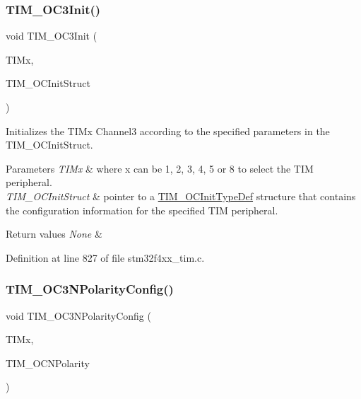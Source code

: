 \subsubsection{\texorpdfstring{T\+I\+M\+\_\+\+O\+C3\+Init()}{TIM\_OC3Init()}}
{\footnotesize\ttfamily void T\+I\+M\+\_\+\+O\+C3\+Init (\begin{DoxyParamCaption}\item[{\hyperlink{struct_t_i_m___type_def}{T\+I\+M\+\_\+\+Type\+Def} $\ast$}]{T\+I\+Mx,  }\item[{\hyperlink{struct_t_i_m___o_c_init_type_def}{T\+I\+M\+\_\+\+O\+C\+Init\+Type\+Def} $\ast$}]{T\+I\+M\+\_\+\+O\+C\+Init\+Struct }\end{DoxyParamCaption})}



Initializes the T\+I\+Mx Channel3 according to the specified parameters in the T\+I\+M\+\_\+\+O\+C\+Init\+Struct. 


\begin{DoxyParams}{Parameters}
{\em T\+I\+Mx} & where x can be 1, 2, 3, 4, 5 or 8 to select the T\+IM peripheral. \\
\hline
{\em T\+I\+M\+\_\+\+O\+C\+Init\+Struct} & pointer to a \hyperlink{struct_t_i_m___o_c_init_type_def}{T\+I\+M\+\_\+\+O\+C\+Init\+Type\+Def} structure that contains the configuration information for the specified T\+IM peripheral. \\
\hline
\end{DoxyParams}

\begin{DoxyRetVals}{Return values}
{\em None} & \\
\hline
\end{DoxyRetVals}


Definition at line 827 of file stm32f4xx\+\_\+tim.\+c.

\mbox{\label{group___t_i_m_gac710acc5b682e892584fc6f089f61dc2}} 
\subsubsection{\texorpdfstring{T\+I\+M\+\_\+\+O\+C3\+N\+Polarity\+Config()}{TIM\_OC3NPolarityConfig()}}
{\footnotesize\ttfamily void T\+I\+M\+\_\+\+O\+C3\+N\+Polarity\+Config (\begin{DoxyParamCaption}\item[{\hyperlink{struct_t_i_m___type_def}{T\+I\+M\+\_\+\+Type\+Def} $\ast$}]{T\+I\+Mx,  }\item[{uint16\+\_\+t}]{T\+I\+M\+\_\+\+O\+C\+N\+Polarity }\end{DoxyParamCaption})}




